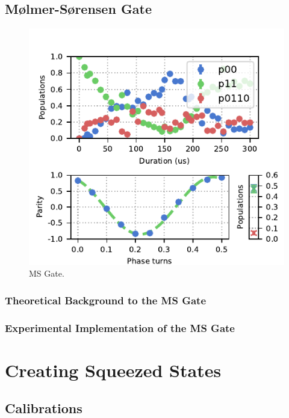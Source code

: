\documentclass[12pt]{report}
\begin{document}
\subsection{Mølmer-Sørensen Gate}
    \begin{figure}
        \begin{center}
        \noindent\includegraphics[width=\linewidth]{
            figures/pdf_figure/ms_gate.pdf
            }
        \end{center}
        \caption{
            MS Gate.
            }
        \label{fig:ms_gate}
    \end{figure}
\subsubsection{Theoretical Background to the MS Gate}
\subsubsection{Experimental Implementation of the MS Gate}

\section{Creating Squeezed States}
\label{sec:Squeezed States}
\subsection{Calibrations}
\end{document}
